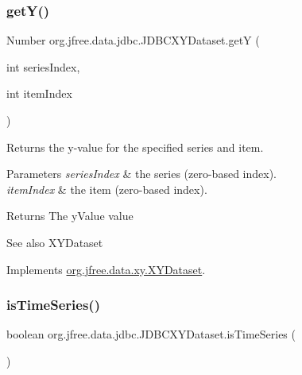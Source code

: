 \subsubsection{\texorpdfstring{get\+Y()}{getY()}}
{\footnotesize\ttfamily Number org.\+jfree.\+data.\+jdbc.\+J\+D\+B\+C\+X\+Y\+Dataset.\+getY (\begin{DoxyParamCaption}\item[{int}]{series\+Index,  }\item[{int}]{item\+Index }\end{DoxyParamCaption})}

Returns the y-\/value for the specified series and item.


\begin{DoxyParams}{Parameters}
{\em series\+Index} & the series (zero-\/based index). \\
\hline
{\em item\+Index} & the item (zero-\/based index).\\
\hline
\end{DoxyParams}
\begin{DoxyReturn}{Returns}
The y\+Value value
\end{DoxyReturn}
\begin{DoxySeeAlso}{See also}
X\+Y\+Dataset 
\end{DoxySeeAlso}


Implements \mbox{\hyperlink{interfaceorg_1_1jfree_1_1data_1_1xy_1_1_x_y_dataset_aa915867221e0f94021bad3140db5254e}{org.\+jfree.\+data.\+xy.\+X\+Y\+Dataset}}.

\mbox{\label{classorg_1_1jfree_1_1data_1_1jdbc_1_1_j_d_b_c_x_y_dataset_adf1a30b0b84fc082de0a9b922cbbc47b}} 
\subsubsection{\texorpdfstring{is\+Time\+Series()}{isTimeSeries()}}
{\footnotesize\ttfamily boolean org.\+jfree.\+data.\+jdbc.\+J\+D\+B\+C\+X\+Y\+Dataset.\+is\+Time\+Series (\begin{DoxyParamCaption}{ }\end{DoxyParamCaption})}

